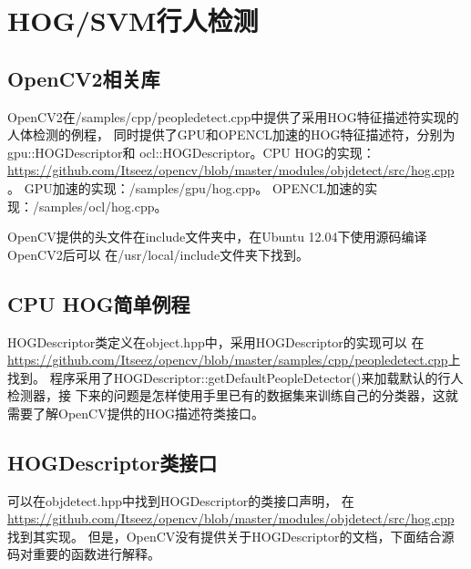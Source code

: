 \section{HOG/SVM行人检测}
\subsection{OpenCV2相关库}
OpenCV2在\textsf{/samples/cpp/peopledetect.cpp}中提供了采用HOG特征描述符实现的人体检测的例程，
同时提供了GPU和OPENCL加速的HOG特征描述符，分别为\textsf{gpu::HOGDescriptor}和
\textsf{ocl::HOGDescriptor}。CPU HOG的实现：
\url{https://github.com/Itseez/opencv/blob/master/modules/objdetect/src/hog.cpp}。
GPU加速的实现：\textsf{/samples/gpu/hog.cpp}。
OPENCL加速的实现：\textsf{/samples/ocl/hog.cpp}。

OpenCV提供的头文件在\textsf{include}文件夹中，在Ubuntu 12.04下使用源码编译OpenCV2后可以
在\textsf{/usr/local/include}文件夹下找到。

\subsection{CPU HOG简单例程}
\textsf{HOGDescriptor}类定义在\textsf{object.hpp}中，采用\textsf{HOGDescriptor}的实现可以
在\url{https://github.com/Itseez/opencv/blob/master/samples/cpp/peopledetect.cpp}上找到。
程序采用了\textsf{HOGDescriptor::getDefaultPeopleDetector()}来加载默认的行人检测器，接
下来的问题是怎样使用手里已有的数据集来训练自己的分类器，这就需要了解OpenCV提供的HOG描述符类接口。

\subsection{HOGDescriptor类接口}
可以在\textsf{objdetect.hpp}中找到\textsf{HOGDescriptor}的类接口声明，
在\url{https://github.com/Itseez/opencv/blob/master/modules/objdetect/src/hog.cpp}找到其实现。
但是，OpenCV没有提供关于HOGDescriptor的文档，下面结合源码对重要的函数进行解释。

